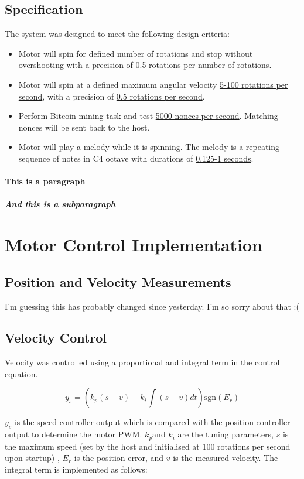 \documentclass{article}
\begin{document}
\subsection{Specification}
\noindent The system was designed to meet the following design criteria:
 \begin{itemize}
	\item Motor will spin for defined number of rotations and stop without overshooting with a precision of \underline{0.5 rotations per number of rotations}.
	\item Motor will spin at a defined maximum angular velocity \underline{5-100 rotations per second}, with a precision of \underline{0.5 rotations per second}.
	\item Perform Bitcoin mining task and test \underline{5000 nonces per second}. Matching nonces will be sent back to the host.
	\item Motor will play a melody while it is spinning. The melody is a repeating sequence of notes in C4 octave with durations of \underline{0.125-1 seconds}.
\end{itemize}

\paragraph{This is a paragraph}
\lipsum[2]

\subparagraph{And this is a subparagraph}
\lipsum[3]




\section{Motor Control Implementation}
\subsection{Position and Velocity Measurements}

I'm guessing this has probably changed since yesterday. I'm so sorry about that :(

\subsection{Velocity Control}

Velocity was controlled using a proportional and integral term in the control equation.

\[ y_s = \left( k_p(s-v)+ k_i\int(s-v)dt\right)\textrm{sgn}(E_r)\]

\(y_s\) is the speed controller output which is compared with the position controller output to determine the motor PWM. \(k_p\)and \(k_i\) are the tuning parameters, \(s\) is the maximum speed (set by the host and initialised at 100 rotations per second upon startup) , \(E_r\) is the position error, and \(v\) is the measured velocity. The integral term is implemented as follows:
\end{document}
